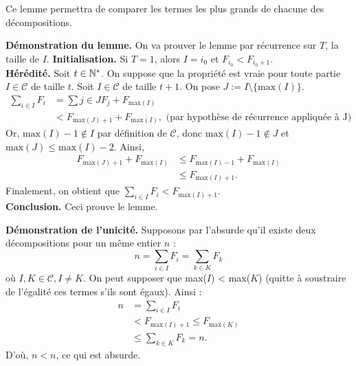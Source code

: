 \begin{exo}
\begin{sol}
Ce lemme permettra de comparer les termes les plus grands de chacune des décompositions.

\textbf{Démonstration du lemme.}
On va prouver le lemme par récurrence sur $T$, la taille de $I$.
\textbf{Initialisation.} Si $T = 1$, alors $I = {i_0}$ et $F_{i_0} < F_{i_0 + 1}$.\\
\textbf{Hérédité.} Soit $t \in \mathbb N^*$. On suppose que la propriété est vraie pour toute partie $I \in \mathcal{C}$ de taille $t$.
Soit $I \in \mathcal C$ de taille $t + 1$. On pose $J := I\setminus\{\text{max}(I)\}$.
\begin{align*}
\sum_{i \in I} F_i &= \sum{j \in J} F_j + F_{\text{max}(I)}\\
		  & < F_{\text{max}(J) +1} + F_{\text{max}(I)},\text{ (par hypothèse de récurrence appliquée à J)}
\end{align*}
Or, $\text{max}(I) -1 \notin I$ par définition de $\mathcal{C}$, donc $\text{max}(I) -1 \notin J$ et $\text{max}(J) \leq \text{max}(I) -2$. Ainsi, 
\begin{align*}
F_{\text{max}(J) +1} + F_{\text{max}(I)} & \leq F_{\text{max}(I) -1} + F_{\text{max}(I)} \\
 & \leq F_{\text{max}(I)+1}.
\end{align*}
Finalement, on obtient que $\sum_{i \in I} F_i < F_{\text{max}(I)+1}$.\\
\textbf{Conclusion.} Ceci prouve le lemme.

\textbf{Démonstration de l'unicité.}
Supposons par l'absurde qu'il existe deux décompositions pour un même entier $n$ :
$$ n = \sum_{i \in I} F_i = \sum_{k \in K} F_k $$
où $I, K \in \mathcal C, I \neq K$.
On peut supposer que max($I$) < max($K$) (quitte à soustraire de l'égalité ces termes s'ils sont égaux). Ainsi :
\begin{align*}
n & = \sum_{i \in I} F_i \\
  & < F_{\text{max}(I)+1} \leq F_{\text{max}(K)} \\
  & \leq \sum_{k \in K} F_k = n.
\end{align*}
D'où, $n < n$, ce qui est absurde.
\end{sol}
\end{exo}

